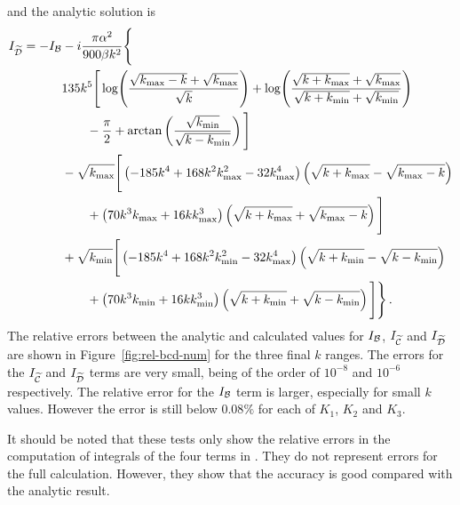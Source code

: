 % 
and the analytic solution is
% 
\begin{align}
\label{eq:dint-soln-num}
I_{\wt{\D}} = -I_\B &-i\frac{\pi\alpha^2}{900\beta k^2}\Bigg\{ \nonumber \\
	&135 k^5 \Bigg[ \log\Biggl(\frac{\sqrt{\kmax-k} + \sqrt{\kmax}}{\sqrt{k}}
			    \Biggr)
	 + \log\Biggl( \frac{\sqrt{k+\kmax} +\sqrt{\kmax}}{\sqrt{k+\kmin} +
			  \sqrt{\kmin}}\Biggr) \nonumber \\
	&\qquad -\frac{\pi}{2} + \arctan\left(
\frac{\sqrt{\kmin}}{\sqrt{k-\kmin}}\right)
	\Bigg] \nonumber\\
% 
        &-\sqrt{\kmax}\Bigg[ \left(-185k^4 + 168k^2\kmax^2-32\kmax^4
	    \right)\left(\sqrt{k+\kmax} - \sqrt{\kmax-k}\right) \nonumber \\
	&\qquad +\left(70k^3\kmax +16k\kmax^3\right) \left(\sqrt{k+\kmax} +
         \sqrt{\kmax -k} \right) \Bigg] \nonumber \\
% 
	&+\sqrt{\kmin}\Bigg[ \left(-185k^4 + 168k^2\kmin^2 -32\kmax^4
	    \right)\left(\sqrt{k+\kmin} - \sqrt{k-\kmin}\right) \nonumber \\
	&\qquad +\left(70k^3\kmin +16k\kmin^3\right) \left(\sqrt{k+\kmin} +
         \sqrt{k-\kmin} \right) \Bigg] \Bigg\} \,.
\end{align}
% 
The relative errors between the analytic and calculated values for $I_{\mathcal{B}}$,
$I_{\widetilde{\mathcal{C}}}$ and $I_{\widetilde{\mathcal{D}}}$ are shown in Figure~\ref{fig:rel-bcd-num} for the
three final $k$ ranges. The errors
for the $I_{\widetilde{\mathcal{C}}}$ and $I_{\widetilde{\mathcal{D}}}$ terms are very small, being of the order of
$10^{-8}$ and $10^{-6}$ respectively. The relative error for the $I_{\mathcal{B}}$ term is
larger, especially for small $k$ values. However the error is still below $0.08\%$
for each of $K_1$, $K_2$ and $K_3$.


It should be noted that these tests only show the relative errors in the
computation of integrals of the four terms in . They
do not represent
errors for the full calculation. However, they show that the accuracy is good
compared with the analytic result. 

